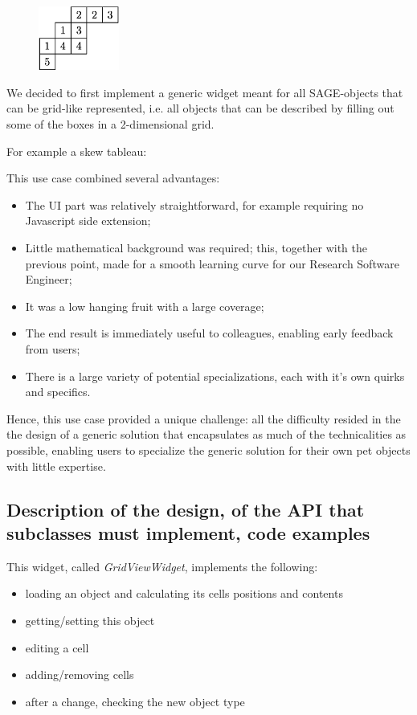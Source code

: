 \documentclass{deliverablereport}
\begin{document}
\begin{figure}
    \begin{center}
      \includegraphics[width=100px]{images/JDTSlide}
\end{center}
\end{figure}

We decided to first implement a generic widget meant for all SAGE-objects that can
be grid-like represented, i.e. all objects that can be described by
filling out some of the boxes in a 2-dimensional grid.

For example a skew tableau:

This use case combined several advantages:
\begin{itemize}
\item The UI part was relatively straightforward, for example
  requiring no Javascript side extension;
\item Little mathematical background was required; this, together with
  the previous point, made for a smooth learning curve for our
  Research Software Engineer;
\item It was a low hanging fruit with a large coverage;
\item The end result is immediately useful to colleagues, enabling
  early feedback from users;
\item There is a large variety of potential specializations, each with
  it's own quirks and specifics.
\end{itemize}
Hence, this use case provided a unique challenge: all the difficulty
resided in the the design of a generic solution that encapsulates as
much of the technicalities as possible, enabling users to specialize
the generic solution for their own pet objects with little expertise.

\subsection{Description of the design, of the API that subclasses must
  implement, code examples}

This widget, called \emph{GridViewWidget}, implements the following:

\begin{itemize}
 \item loading an object and calculating its cells positions and
   contents
 \item getting/setting this object
 \item editing a cell
 \item adding/removing cells
 \item after a change, checking the new object type
\end{itemize}
\end{document}
